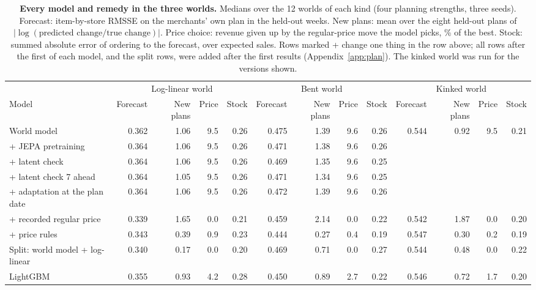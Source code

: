 \begin{table}[t]
\centering
\caption{\textbf{Every model and remedy in the three worlds.} Medians over the 12 worlds of each kind (four planning
strengths, three seeds). Forecast: item-by-store RMSSE on the merchants' own plan in the held-out weeks. New plans:
mean over the eight held-out plans of $|\log(\text{predicted change}/\text{true change})|$. Price choice: revenue
given up by the regular-price move the model picks, \% of the best. Stock: summed absolute error of ordering to the
forecast, over expected sales. Rows marked + change one thing in the row above; all rows after the first of each
model, and the split rows, were added after the first results (Appendix~\ref{app:plan}). The kinked world was run
for the versions shown.}
\label{tab:remedies}
\footnotesize\setlength{\tabcolsep}{3.2pt}
\begin{adjustbox}{max width=\textwidth}
\begin{tabular}{lrrrrrrrrrrrr}
\toprule
 & \multicolumn{4}{c}{Log-linear world} & \multicolumn{4}{c}{Bent world} & \multicolumn{4}{c}{Kinked world} \\
\cmidrule(lr){2-5}\cmidrule(lr){6-9}\cmidrule(lr){10-13}
Model & Forecast & New plans & Price & Stock & Forecast & New plans & Price & Stock & Forecast & New plans & Price & Stock \\
\midrule
World model & 0.362 & 1.06 & 9.5 & 0.26 & 0.475 & 1.39 & 9.6 & 0.26 & 0.544 & 0.92 & 9.5 & 0.21 \\
\quad + JEPA pretraining & 0.364 & 1.06 & 9.5 & 0.26 & 0.471 & 1.38 & 9.6 & 0.26 &  &  &  &  \\
\quad + latent check & 0.364 & 1.06 & 9.5 & 0.26 & 0.469 & 1.35 & 9.6 & 0.25 &  &  &  &  \\
\quad + latent check 7 ahead & 0.364 & 1.05 & 9.5 & 0.26 & 0.471 & 1.34 & 9.6 & 0.25 &  &  &  &  \\
\quad + adaptation at the plan date & 0.364 & 1.06 & 9.5 & 0.26 & 0.472 & 1.39 & 9.6 & 0.26 &  &  &  &  \\
\quad + recorded regular price & 0.339 & 1.65 & 0.0 & 0.21 & 0.459 & 2.14 & 0.0 & 0.22 & 0.542 & 1.87 & 0.0 & 0.20 \\
\quad + price rules & 0.343 & 0.39 & 0.9 & 0.23 & 0.444 & 0.27 & 0.4 & 0.19 & 0.547 & 0.30 & 0.2 & 0.19 \\
Split: world model \quad + log-linear & 0.340 & 0.17 & 0.0 & 0.20 & 0.469 & 0.71 & 0.0 & 0.27 & 0.544 & 0.48 & 0.0 & 0.22 \\
LightGBM & 0.355 & 0.93 & 4.2 & 0.28 & 0.450 & 0.89 & 2.7 & 0.22 & 0.546 & 0.72 & 1.7 & 0.20 \\

\end{tabular}
\end{adjustbox}
\end{table}
